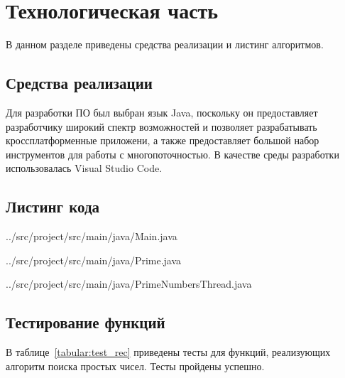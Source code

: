 \chapter{Технологическая часть}

В данном разделе приведены средства реализации и листинг алгоритмов.

\section{Средства реализации}

Для разработки ПО был выбран язык Java, поскольку он предоставляет разработчику широкий спектр возможностей и позволяет разрабатывать кроссплатформенные приложени, а также предоставляет большой набор инструментов для работы с многопоточностью. В качестве среды разработки использовалась Visual Studio Code. \cite{code}

\section{Листинг кода}

\begin{lstinputlisting}[
	caption={Создание и запуск потоков},
	label={lst:simple1},
	style={javalang},
	linerange={13-37}
]{../src/project/src/main/java/Main.java}
\end{lstinputlisting}

\begin{lstinputlisting}[
	caption={Алгоритм поиска простых чисел},
	label={lst:vino1},
	style={javalang},
	linerange={1-30}
]{../src/project/src/main/java/Prime.java}
\end{lstinputlisting}


\begin{lstinputlisting}[
	caption={Метод потока поиска простых чисел},
	label={lst:vino2},
	style={javalang},
	linerange={1-30}
]{../src/project/src/main/java/PrimeNumbersThread.java}
\end{lstinputlisting}

\section{Тестирование функций}

В таблице~\ref{tabular:test_rec} приведены тесты для функций, реализующих алгоритм поиска простых чисел. Тесты пройдены успешно.

